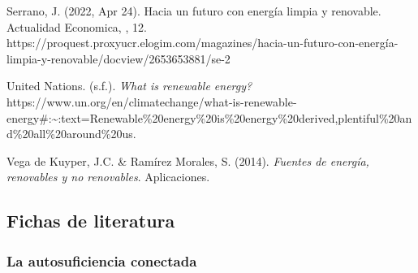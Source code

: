 \documentclass[
  letterpaper,
  DIV=11,
  numbers=noendperiod]{scrreprt}
\begin{document}
Serrano, J. (2022, Apr 24). Hacia un futuro con energía limpia y
renovable. Actualidad Economica, , 12.
https://proquest.proxyucr.elogim.com/magazines/hacia-un-futuro-con-energía-limpia-y-renovable/docview/2653653881/se-2

United Nations. (s.f.). \emph{What is renewable energy?}
 https://www.un.org/en/climatechange/what-is-renewable-energy\#:\textasciitilde:text=Renewable\%20energy\%20is\%20energy\%20derived,plentiful\%20and\%20all\%20around\%20us.

Vega de Kuyper, J.C. \& Ramírez Morales, S. (2014). \emph{Fuentes de
energía, renovables y no renovables}. Aplicaciones.

\subsection{Fichas de literatura}\label{fichas-de-literatura}

\subsubsection{La autosuficiencia
conectada}\label{la-autosuficiencia-conectada}
\end{document}
